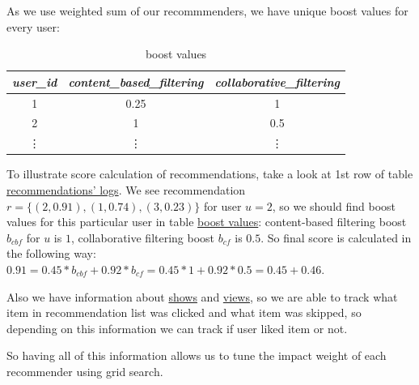 \documentclass{article}
\begin{document}
    As we use weighted sum of our recommmenders, we have unique boost values for every user:

    \begin{table}[h]
        \centering
        \begin{tabular}{ccc}
            \toprule
            \textit{user\_id} & \textit{content\_based\_filtering} & \textit{collaborative\_filtering} \\
            \midrule
            1                 & 0.25                                  & 1                               \\
            2                 & 1                               & 0.5                                \\
            \vdots & \vdots & \vdots \\
            \bottomrule
            \end{tabular}%
        \caption{boost values}
        \label{tab:boost_values}
    \end{table}

    To illustrate score calculation of recommendations, take a look at 1st row of table \hyperref[tab:recommendation_logs]{recommendations' logs}. We see recommendation $r = \{(2, 0.91), (1, 0.74), (3, 0.23)\}$ for user $u = 2$, so we should find boost values for this particular user in table \hyperref[tab:boost_values]{boost values}: content-based filtering boost $b_{cbf}$ for $u$ is $1$, collaborative filtering boost $b_{cf}$ is $0.5$. So final score is calculated in the following way: $0.91 = 0.45 * b_{cbf} + 0.92 * b_{cf} = 0.45 * 1 + 0.92 * 0.5 = 0.45 + 0.46$.

    Also we have information about \hyperref[tab:show]{shows} and \hyperref[tab:view]{views}, so we are able to track what item in recommendation list was clicked and what item was skipped, so depending on this information we can track if user liked item or not.

    So having all of this information allows us to tune the impact weight of each recommender using grid search.




\end{document}
